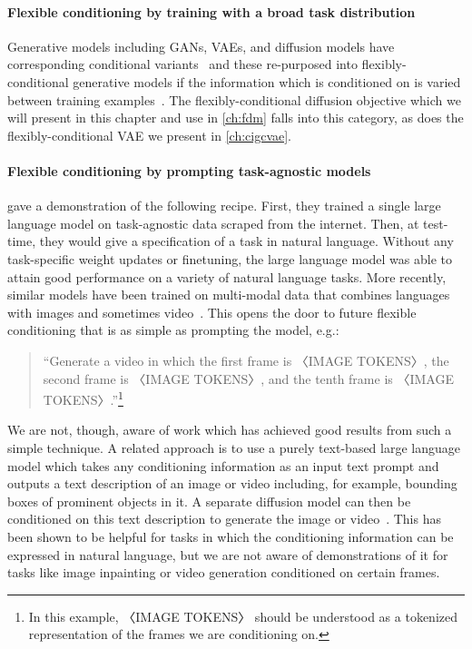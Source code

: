 \paragraph{Flexible conditioning by training with a broad task distribution}
Generative models including GANs, VAEs, and diffusion models have corresponding conditional variants~\citep{mirza2014conditional,sohn2015learning,tashiro2021csdi} and these re-purposed into flexibly-conditional generative models if the information which is conditioned on is varied between training examples~\citep{zhao2021large,ivanov2018variational,tashiro2021csdi}. The flexibly-conditional diffusion objective which we will present in this chapter and use in \cref{ch:fdm} falls into this category, as does the flexibly-conditional VAE we present in \cref{ch:cigcvae}.

\paragraph{Flexible conditioning by prompting task-agnostic models}
\citet{brown2020language} gave a demonstration of the following recipe. First, they trained a single large language model on task-agnostic data scraped from the internet. Then, at test-time, they would give a specification of a task in natural language. Without any task-specific weight updates or finetuning, the large language model was able to attain good performance on a variety of natural language tasks. More recently, similar models have been trained on multi-modal data that combines languages with images and sometimes video~\citep{openai2023gpt,team2023gemini,kondratyuk2023videopoet}. This opens the door to future flexible conditioning that is as simple as prompting the model, e.g.: 
\begin{quote}
    ``Generate a video in which the first frame is 〈IMAGE TOKENS〉, the second frame is 〈IMAGE TOKENS〉, and the tenth frame is 〈IMAGE TOKENS〉.''\footnote{In this example, 〈IMAGE TOKENS〉 should be understood as a tokenized representation of the frames we are conditioning on.}
\end{quote}
We are not, though, aware of work which has achieved good results from such a simple technique. A related approach is to use a purely text-based large language model which takes any conditioning information as an input text prompt and outputs a text description of an image or video including, for example, bounding boxes of prominent objects in it. A separate diffusion model can then be conditioned on this text description to generate the image or video~\citep{lian2023llm}. This has been shown to be helpful for tasks in which the conditioning information can be expressed in natural language, but we are not aware of demonstrations of it for tasks like image inpainting or video generation conditioned on certain frames.

